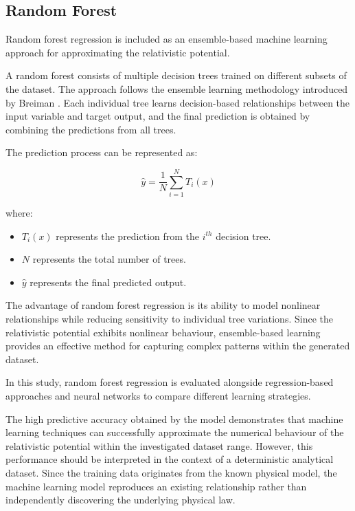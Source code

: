 \documentclass[
]{article}
\begin{document}
\subsection{Random Forest}\label{random-forest}

Random forest regression is included as an ensemble-based machine
learning approach for approximating the relativistic potential.

A random forest consists of multiple decision trees trained on different
subsets of the dataset. The approach follows the ensemble learning
methodology introduced by Breiman \cite{breiman2001}. Each individual
tree learns decision-based relationships between the input variable and
target output, and the final prediction is obtained by combining the
predictions from all trees.

The prediction process can be represented as:

\[
\hat{y}=\frac{1}{N}\sum_{i=1}^{N}T_i(x)
\]

where:

\begin{itemize}
\item $T_i(x)$ represents the prediction from the $i^{th}$ decision tree.
\item $N$ represents the total number of trees.
\item $\hat{y}$ represents the final predicted output.
\end{itemize}

The advantage of random forest regression is its ability to model
nonlinear relationships while reducing sensitivity to individual tree
variations. Since the relativistic potential exhibits nonlinear
behaviour, ensemble-based learning provides an effective method for
capturing complex patterns within the generated dataset.

In this study, random forest regression is evaluated alongside
regression-based approaches and neural networks to compare different
learning strategies.

The high predictive accuracy obtained by the model demonstrates that
machine learning techniques can successfully approximate the numerical
behaviour of the relativistic potential within the investigated dataset
range. However, this performance should be interpreted in the context of
a deterministic analytical dataset. Since the training data originates
from the known physical model, the machine learning model reproduces an
existing relationship rather than independently discovering the
underlying physical law.
\end{document}
